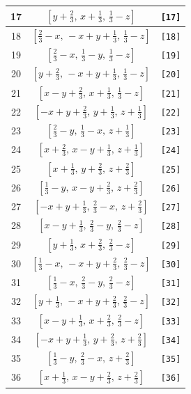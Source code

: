 \documentclass[fleqn,8pt]{jsarticle}
\begin{document}
\begin{longtable}{ccc}
17 & $\left[ y + \frac{2}{3},\, x + \frac{1}{3},\, \frac{1}{3} - z \right]$ & {\tt [17]} \\ \hline
18 & $\left[ \frac{2}{3} - x,\, - x + y + \frac{1}{3},\, \frac{1}{3} - z \right]$ & {\tt [18]} \\ \hline
19 & $\left[ \frac{2}{3} - x,\, \frac{1}{3} - y,\, \frac{1}{3} - z \right]$ & {\tt [19]} \\ \hline
20 & $\left[ y + \frac{2}{3},\, - x + y + \frac{1}{3},\, \frac{1}{3} - z \right]$ & {\tt [20]} \\ \hline
21 & $\left[ x - y + \frac{2}{3},\, x + \frac{1}{3},\, \frac{1}{3} - z \right]$ & {\tt [21]} \\ \hline
22 & $\left[ - x + y + \frac{2}{3},\, y + \frac{1}{3},\, z + \frac{1}{3} \right]$ & {\tt [22]} \\ \hline
23 & $\left[ \frac{2}{3} - y,\, \frac{1}{3} - x,\, z + \frac{1}{3} \right]$ & {\tt [23]} \\ \hline
24 & $\left[ x + \frac{2}{3},\, x - y + \frac{1}{3},\, z + \frac{1}{3} \right]$ & {\tt [24]} \\ \hline
25 & $\left[ x + \frac{1}{3},\, y + \frac{2}{3},\, z + \frac{2}{3} \right]$ & {\tt [25]} \\ \hline
26 & $\left[ \frac{1}{3} - y,\, x - y + \frac{2}{3},\, z + \frac{2}{3} \right]$ & {\tt [26]} \\ \hline
27 & $\left[ - x + y + \frac{1}{3},\, \frac{2}{3} - x,\, z + \frac{2}{3} \right]$ & {\tt [27]} \\ \hline
28 & $\left[ x - y + \frac{1}{3},\, \frac{2}{3} - y,\, \frac{2}{3} - z \right]$ & {\tt [28]} \\ \hline
29 & $\left[ y + \frac{1}{3},\, x + \frac{2}{3},\, \frac{2}{3} - z \right]$ & {\tt [29]} \\ \hline
30 & $\left[ \frac{1}{3} - x,\, - x + y + \frac{2}{3},\, \frac{2}{3} - z \right]$ & {\tt [30]} \\ \hline
31 & $\left[ \frac{1}{3} - x,\, \frac{2}{3} - y,\, \frac{2}{3} - z \right]$ & {\tt [31]} \\ \hline
32 & $\left[ y + \frac{1}{3},\, - x + y + \frac{2}{3},\, \frac{2}{3} - z \right]$ & {\tt [32]} \\ \hline
33 & $\left[ x - y + \frac{1}{3},\, x + \frac{2}{3},\, \frac{2}{3} - z \right]$ & {\tt [33]} \\ \hline
34 & $\left[ - x + y + \frac{1}{3},\, y + \frac{2}{3},\, z + \frac{2}{3} \right]$ & {\tt [34]} \\ \hline
35 & $\left[ \frac{1}{3} - y,\, \frac{2}{3} - x,\, z + \frac{2}{3} \right]$ & {\tt [35]} \\ \hline
36 & $\left[ x + \frac{1}{3},\, x - y + \frac{2}{3},\, z + \frac{2}{3} \right]$ & {\tt [36]} \\
\end{longtable}
\end{document}
